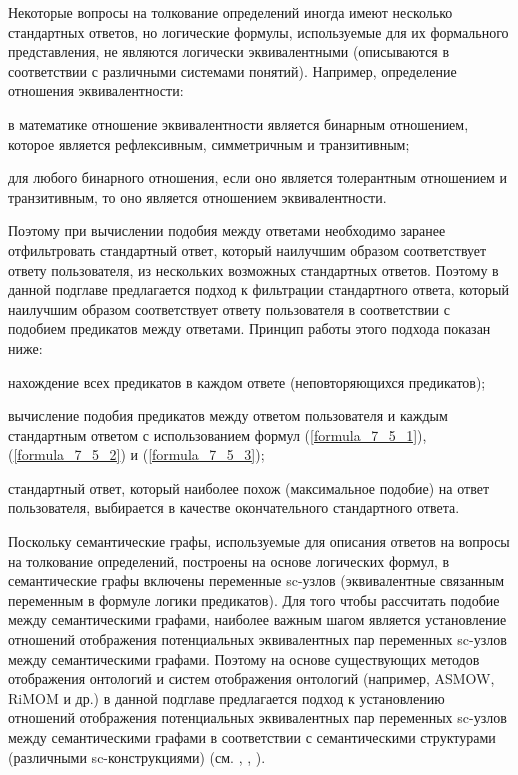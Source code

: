 Некоторые вопросы на толкование определений иногда имеют несколько стандартных ответов, но логические формулы, используемые для их формального представления, не являются логически эквивалентными (описываются в соответствии с различными системами понятий). Например, определение отношения эквивалентности:

\begin{textitemize}
	\item в математике отношение эквивалентности является бинарным отношением, которое является рефлексивным, симметричным и транзитивным;
	\item для любого бинарного отношения, если оно является толерантным отношением и транзитивным, то оно является отношением эквивалентности.
\end{textitemize}

Поэтому при вычислении подобия между ответами необходимо заранее отфильтровать стандартный ответ, который наилучшим образом соответствует ответу пользователя, из нескольких возможных стандартных ответов. Поэтому в данной подглаве предлагается подход к фильтрации стандартного ответа, который наилучшим образом соответствует ответу пользователя в соответствии с подобием предикатов между ответами. Принцип работы этого подхода показан ниже:

\begin{textitemize}
	\item нахождение всех предикатов в каждом ответе (неповторяющихся предикатов);
	\item вычисление подобия предикатов между ответом пользователя и каждым стандартным ответом с использованием формул (\ref{formula_7_5_1}), (\ref{formula_7_5_2}) и (\ref{formula_7_5_3}); 
	\item стандартный ответ, который наиболее похож (максимальное подобие) на ответ пользователя, выбирается в качестве окончательного стандартного ответа.
\end{textitemize}

Поскольку семантические графы, используемые для описания ответов на вопросы на толкование определений, построены на основе логических формул, в семантические графы включены переменные sc-узлов (эквивалентные связанным переменным в формуле логики предикатов). Для того чтобы рассчитать подобие между семантическими графами, наиболее важным шагом является установление отношений отображения потенциальных эквивалентных пар переменных sc-узлов между семантическими графами. Поэтому на основе существующих методов отображения онтологий и систем отображения онтологий (например, ASMOW, RiMOM и др.) в данной подглаве предлагается подход к установлению отношений отображения потенциальных эквивалентных пар переменных sc-узлов между семантическими графами в соответствии с семантическими структурами (различными sc-конструкциями) (см. , , ).

